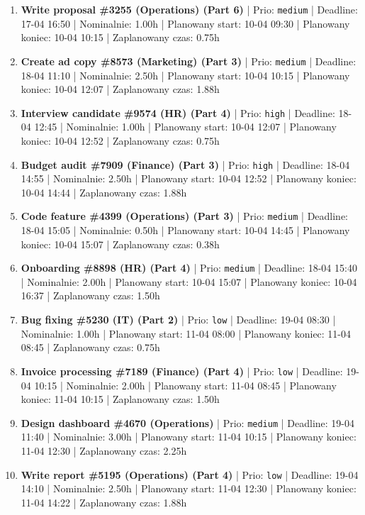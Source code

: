 {\begin{enumerate}
  \item [\textbf{14654}] \textbf{Write proposal \#3255 (Operations) (Part 6)} | Prio: \texttt{medium} | Deadline: 17-04 16:50 | Nominalnie: 1.00h | Planowany start: 10-04 09:30 | Planowany koniec: 10-04 10:15 | Zaplanowany czas: 0.75h
  \item [\textbf{14677}] \textbf{Create ad copy \#8573 (Marketing) (Part 3)} | Prio: \texttt{medium} | Deadline: 18-04 11:10 | Nominalnie: 2.50h | Planowany start: 10-04 10:15 | Planowany koniec: 10-04 12:07 | Zaplanowany czas: 1.88h
  \item [\textbf{14612}] \textbf{Interview candidate \#9574 (HR) (Part 4)} | Prio: \texttt{high} | Deadline: 18-04 12:45 | Nominalnie: 1.00h | Planowany start: 10-04 12:07 | Planowany koniec: 10-04 12:52 | Zaplanowany czas: 0.75h
  \item [\textbf{14616}] \textbf{Budget audit \#7909 (Finance) (Part 3)} | Prio: \texttt{high} | Deadline: 18-04 14:55 | Nominalnie: 2.50h | Planowany start: 10-04 12:52 | Planowany koniec: 10-04 14:44 | Zaplanowany czas: 1.88h
  \item [\textbf{14664}] \textbf{Code feature \#4399 (Operations) (Part 3)} | Prio: \texttt{medium} | Deadline: 18-04 15:05 | Nominalnie: 0.50h | Planowany start: 10-04 14:45 | Planowany koniec: 10-04 15:07 | Zaplanowany czas: 0.38h
  \item [\textbf{14636}] \textbf{Onboarding \#8898 (HR) (Part 4)} | Prio: \texttt{medium} | Deadline: 18-04 15:40 | Nominalnie: 2.00h | Planowany start: 10-04 15:07 | Planowany koniec: 10-04 16:37 | Zaplanowany czas: 1.50h
  \item [\textbf{14680}] \textbf{Bug fixing \#5230 (IT) (Part 2)} | Prio: \texttt{low} | Deadline: 19-04 08:30 | Nominalnie: 1.00h | Planowany start: 11-04 08:00 | Planowany koniec: 11-04 08:45 | Zaplanowany czas: 0.75h
  \item [\textbf{14678}] \textbf{Invoice processing \#7189 (Finance) (Part 4)} | Prio: \texttt{low} | Deadline: 19-04 10:15 | Nominalnie: 2.00h | Planowany start: 11-04 08:45 | Planowany koniec: 11-04 10:15 | Zaplanowany czas: 1.50h
  \item [\textbf{14676}] \textbf{Design dashboard \#4670 (Operations)} | Prio: \texttt{medium} | Deadline: 19-04 11:40 | Nominalnie: 3.00h | Planowany start: 11-04 10:15 | Planowany koniec: 11-04 12:30 | Zaplanowany czas: 2.25h
  \item [\textbf{14687}] \textbf{Write report \#5195 (Operations) (Part 4)} | Prio: \texttt{low} | Deadline: 19-04 14:10 | Nominalnie: 2.50h | Planowany start: 11-04 12:30 | Planowany koniec: 11-04 14:22 | Zaplanowany czas: 1.88h

\end{enumerate}}
